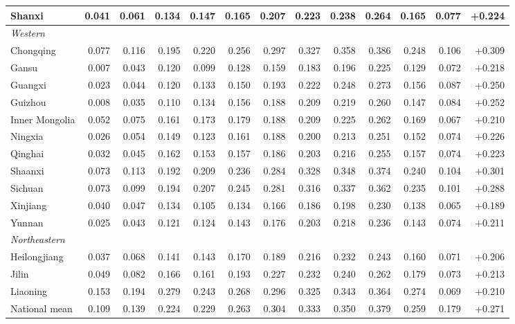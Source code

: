 \begin{tabular}{lrrrrrrrrrrrr}
Shanxi & 0.041 & 0.061 & 0.134 & 0.147 & 0.165 & 0.207 & 0.223 & 0.238 & 0.264 & 0.165 & 0.077 & +0.224 \\
\midrule
\multicolumn{13}{l}{\textit{Western}} \\
Chongqing & 0.077 & 0.116 & 0.195 & 0.220 & 0.256 & 0.297 & 0.327 & 0.358 & 0.386 & 0.248 & 0.106 & +0.309 \\
Gansu & 0.007 & 0.043 & 0.120 & 0.099 & 0.128 & 0.159 & 0.183 & 0.196 & 0.225 & 0.129 & 0.072 & +0.218 \\
Guangxi & 0.023 & 0.044 & 0.120 & 0.133 & 0.150 & 0.193 & 0.222 & 0.248 & 0.273 & 0.156 & 0.087 & +0.250 \\
Guizhou & 0.008 & 0.035 & 0.110 & 0.134 & 0.156 & 0.188 & 0.209 & 0.219 & 0.260 & 0.147 & 0.084 & +0.252 \\
Inner Mongolia & 0.052 & 0.075 & 0.161 & 0.173 & 0.179 & 0.188 & 0.209 & 0.225 & 0.262 & 0.169 & 0.067 & +0.210 \\
Ningxia & 0.026 & 0.054 & 0.149 & 0.123 & 0.161 & 0.188 & 0.200 & 0.213 & 0.251 & 0.152 & 0.074 & +0.226 \\
Qinghai & 0.032 & 0.045 & 0.162 & 0.153 & 0.157 & 0.186 & 0.203 & 0.216 & 0.255 & 0.157 & 0.074 & +0.223 \\
Shaanxi & 0.073 & 0.113 & 0.192 & 0.209 & 0.236 & 0.284 & 0.328 & 0.348 & 0.374 & 0.240 & 0.104 & +0.301 \\
Sichuan & 0.073 & 0.099 & 0.194 & 0.207 & 0.245 & 0.281 & 0.316 & 0.337 & 0.362 & 0.235 & 0.101 & +0.288 \\
Xinjiang & 0.040 & 0.047 & 0.134 & 0.105 & 0.134 & 0.166 & 0.186 & 0.198 & 0.230 & 0.138 & 0.065 & +0.189 \\
Yunnan & 0.025 & 0.043 & 0.121 & 0.124 & 0.143 & 0.176 & 0.203 & 0.218 & 0.236 & 0.143 & 0.074 & +0.211 \\
\midrule
\multicolumn{13}{l}{\textit{Northeastern}} \\
Heilongjiang & 0.037 & 0.068 & 0.141 & 0.143 & 0.170 & 0.189 & 0.216 & 0.232 & 0.243 & 0.160 & 0.071 & +0.206 \\
Jilin & 0.049 & 0.082 & 0.166 & 0.161 & 0.193 & 0.227 & 0.232 & 0.240 & 0.262 & 0.179 & 0.073 & +0.213 \\
Liaoning & 0.153 & 0.194 & 0.279 & 0.243 & 0.268 & 0.296 & 0.325 & 0.343 & 0.364 & 0.274 & 0.069 & +0.210 \\
\midrule
National mean & 0.109 & 0.139 & 0.224 & 0.229 & 0.263 & 0.304 & 0.333 & 0.350 & 0.379 & 0.259 & 0.179 & +0.271 \\
\bottomrule
\end{tabular}
